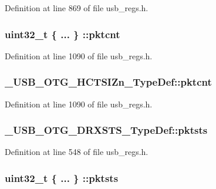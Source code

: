 Definition at line 869 of file usb\-\_\-regs.\-h.

\hypertarget{group___u_s_b___o_t_g___d_r_i_v_e_r_ga72b217918802cb052c3e7ab298dfe6d6}{
\subsubsection[{pktcnt}]{\setlength{\rightskip}{0pt plus 5cm}uint32\-\_\-t \{ ... \} \-::pktcnt}}\label{group___u_s_b___o_t_g___d_r_i_v_e_r_ga72b217918802cb052c3e7ab298dfe6d6}


Definition at line 1090 of file usb\-\_\-regs.\-h.

\hypertarget{group___u_s_b___o_t_g___d_r_i_v_e_r_ga053e63325d6dfa002f2efd2468957465}{
\subsubsection[{pktcnt}]{ \-\_\-\-U\-S\-B\-\_\-\-O\-T\-G\-\_\-\-H\-C\-T\-S\-I\-Zn\-\_\-\-Type\-Def\-::pktcnt}}\label{group___u_s_b___o_t_g___d_r_i_v_e_r_ga053e63325d6dfa002f2efd2468957465}


Definition at line 1090 of file usb\-\_\-regs.\-h.

\hypertarget{group___u_s_b___o_t_g___d_r_i_v_e_r_gaa545e32b80f0074a447ba35d16914bee}{
\subsubsection[{pktsts}]{ \-\_\-\-U\-S\-B\-\_\-\-O\-T\-G\-\_\-\-D\-R\-X\-S\-T\-S\-\_\-\-Type\-Def\-::pktsts}}\label{group___u_s_b___o_t_g___d_r_i_v_e_r_gaa545e32b80f0074a447ba35d16914bee}


Definition at line 548 of file usb\-\_\-regs.\-h.

\hypertarget{group___u_s_b___o_t_g___d_r_i_v_e_r_ga540cc3ee9e88834f350fefe93e86ba20}{
\subsubsection[{pktsts}]{\setlength{\rightskip}{0pt plus 5cm}uint32\-\_\-t \{ ... \} \-::pktsts}}\label{group___u_s_b___o_t_g___d_r_i_v_e_r_ga540cc3ee9e88834f350fefe93e86ba20}


